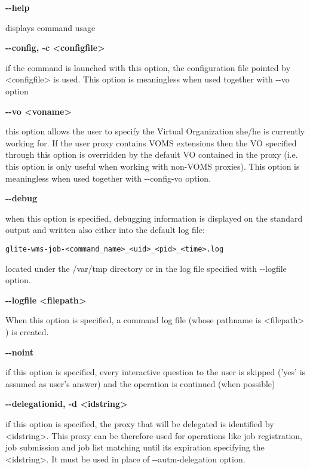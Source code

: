\textbf{-{}-help}

displays command usage




\textbf{-{}-config, -c <configfile>}

if the command is launched with this option, the configuration file pointed by <configfile> is used. This option is meaningless when used together with -{}-vo option




\textbf{-{}-vo <voname>}

this option allows the user to specify the Virtual Organization she/he is currently working for.
If the user proxy contains VOMS extensions then the VO specified through this option is overridden by the
default VO contained in the proxy (i.e. this option is only useful when working with non-VOMS proxies).
This option is meaningless when used together with -{}-config-vo option.




\textbf{-{}-debug}

when this option is specified, debugging information is displayed on the standard output and written also either into the default log file:


\begin{verbatim}
glite-wms-job-<command_name>_<uid>_<pid>_<time>.log
\end{verbatim}

located under the /var/tmp  directory or in the log file specified with -{}-logfile option.




\textbf{-{}-logfile <filepath>}

When this option is specified, a command log file (whose pathname is <filepath> ) is created.



\textbf{-{}-noint}

if this option is specified, every interactive question to the user is skipped ('yes' is assumed as user's answer) and the operation is continued (when possible)





\textbf{-{}-delegationid, -d <idstring>}

if this option is specified, the proxy that will be delegated is identified by <idstring>. This proxy can be therefore used for operations like
job registration, job submission and job list matching until its expiration specifying the <idstring>. It must be used in place of -{}-autm-delegation option.





